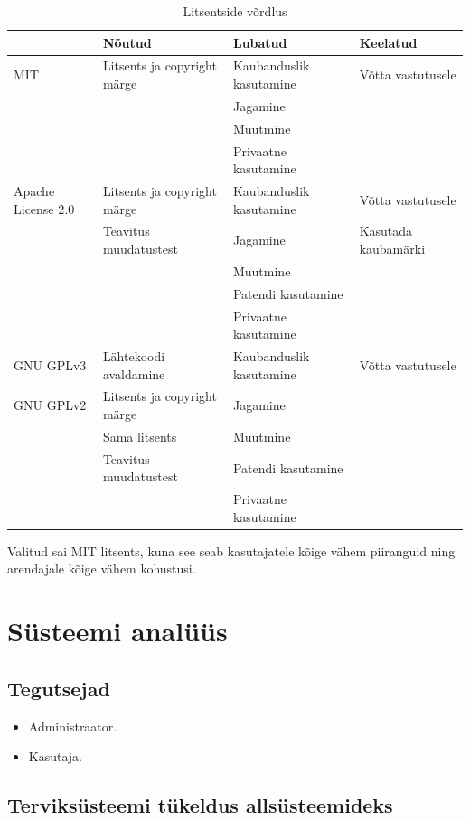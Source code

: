\documentclass[a4paper,12pt]{article} %
\begin{document}
\begin{table}[H]%
\begin{center}
\begin{tabular}{|p{3cm}|p{4cm}|p{4cm}|p{4cm}|}
\hline
\rowcolor{rowgray}
 & Nõutud & Lubatud & Keelatud \\ \hline
MIT & Litsents ja copyright märge & Kaubanduslik kasutamine & Võtta vastutusele \\
 &  & Jagamine &  \\
 &  & Muutmine &  \\
 &  & Privaatne kasutamine &  \\ \hline
Apache \newline License 2.0 & Litsents ja copyright märge & Kaubanduslik kasutamine & Võtta vastutusele \\
 & Teavitus muudatustest & Jagamine & Kasutada kaubamärki \\
 &  & Muutmine &  \\
 &  & Patendi kasutamine &  \\
 &  & Privaatne kasutamine &  \\ \hline
GNU GPLv3 & Lähtekoodi avaldamine & Kaubanduslik kasutamine & Võtta vastutusele \\
GNU GPLv2 & Litsents ja copyright märge & Jagamine &  \\
 & Sama litsents & Muutmine &  \\
 & Teavitus muudatustest & Patendi kasutamine &  \\
 &  & Privaatne kasutamine & \\ \hline
\end{tabular}
\caption{Litsentside võrdlus}
\label{table_litsentside_vordlus}
\cite{Licences}
\end{center}
\end{table}
Valitud sai MIT litsents, kuna see seab kasutajatele kõige vähem piiranguid ning arendajale kõige vähem kohustusi.
\section{Süsteemi analüüs}
\subsection{Tegutsejad}
\begin{itemize}
\item Administraator.
\item Kasutaja.
\end{itemize}
\subsection{Terviksüsteemi tükeldus allsüsteemideks}
\end{document}
